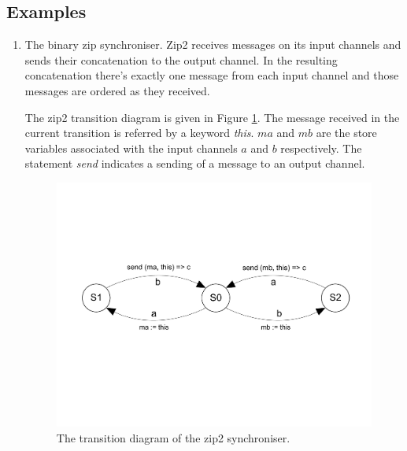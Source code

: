 \documentclass{article}
\begin{document}
\subsection{Examples}
\begin{enumerate}

\item The binary zip synchroniser. Zip2 receives messages on its input channels and sends their concatenation to the output channel. In the resulting concatenation there's exactly one message from each input channel and those messages are ordered as they received.

The zip2 transition diagram is given in Figure \ref{fig:zip2}. The message received in the current transition is referred by a keyword \emph{this}. $ma$ and $mb$ are the store variables associated with the input channels $a$ and $b$ respectively. The statement \emph{send} indicates a sending of a message to an output channel.

  \begin{figure}[here]
  \centering
  \includegraphics[scale=0.4]{figs/zip2.pdf}
  \caption{The transition diagram of the zip2 synchroniser.}
  \label{fig:zip2}
  \end{figure}


\end{enumerate}
\end{document}
